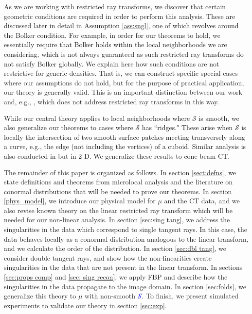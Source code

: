 \documentclass[11pt]{article}
\newcommand{\s}{\mathcal S}
\numberwithin{equation}{section}
\theoremstyle{definition}
\newcommand{\tblu}{\textcolor{blue}}
\begin{document}
As we are working with restricted ray transforms, we discover that certain geometric conditions are required in order to perform this analysis. These are discussed later in detail in Assumption \ref{ass:sngl}, one of which revolves around the Bolker condition. For example, in order for our theorems to hold, we essentially require that Bolker holds within the local neighborhoods we are considering, which is not always guaranteed as such restricted ray transforms do not satisfy Bolker globally. We explain here how such conditions are not restrictive for generic densities. That is, we can construct specific special cases where our assumptions do not hold, but for the purpose of practical application, our theory is generally valid. This is an important distinction between our work and, e.g., \cite{chihara2024geodesic}, which does not address restricted ray transforms in this way. 

While our central theory applies to local neighborhoods where $\s$ is smooth, we also generalize our theorems to cases where $\s$ has ``ridges." These arise when $\s$ is locally the intersection of two smooth surface patches meeting transversely along a curve, e.g., the edge (not including the vertices) of a cuboid. Similar analysis is also conducted in \cite{katsevich2026} but in 2-D. We generalize these results to cone-beam CT.

The remainder of this paper is organized as follows. In section \ref{sect:defns}, we state definitions and theorems from microlocal analysis and the literature on conormal distributions that will be needed to prove our theorems. In section \ref{phys_model}, we introduce our physical model for $\mu$ and the CT data, and we also revise known theory on the linear restricted ray transform which will be needed for our non-linear analysis. In section \ref{sec:sing tang}, we address the singularities in the data which correspond to single tangent rays. In this case, the data behaves locally as a conormal distribution analogous to the linear transform, and we calculate the order of the distribution. In section \ref{sec:dbl tang}, we consider double tangent rays, and show how the non-linearities create singularities in the data that are not present in the linear transform. In sections \ref{sec:props comp} and \ref{sec: sing recon}, we apply FBP and describe how the singularities in the data propagate to the image domain. In section \ref{sec:folds}, we generalize this theory to $\mu$ with non-smooth \tblu{$\s$}. To finish, we present simulated experiments to validate our theory in section \ref{sec:exp}.
\end{document}
